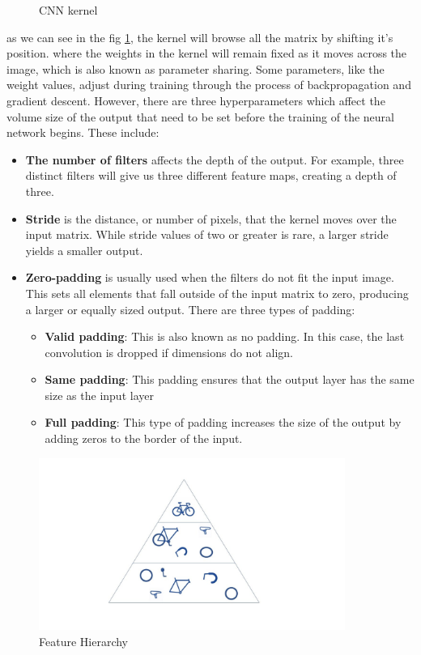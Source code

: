 \begin{enumerate}
\begin{figure}[H]
            \caption{CNN kernel}
            \label{fig:CNN-kernel}
        \end{figure}
        as we can see in the fig \ref{fig:CNN-kernel}, the kernel will browse all the matrix by shifting it's position. where the weights in the kernel will remain fixed as it moves across the image, which is also known as parameter sharing. Some parameters, like the weight values, adjust during training through the process of backpropagation and gradient descent. However, there are three hyperparameters which affect the volume size of the output that need to be set before the training of the neural network begins. These include:
        \begin{itemize}
            \item \textbf{The number of filters} affects the depth of the output. For example, three distinct filters will give us three different feature maps, creating a depth of three.
            \item \textbf{Stride} is the distance, or number of pixels, that the kernel moves over the input matrix. While stride values of two or greater is rare, a larger stride yields a smaller output.
            \item \textbf{Zero-padding }is usually used when the filters do not fit the input image. This sets all elements that fall outside of the input matrix to zero, producing a larger or equally sized output. There are three types of padding:
            \begin{itemize}
                \item \textbf{Valid padding}: This is also known as no padding. In this case, the last convolution is dropped if dimensions do not align.
                \item \textbf{Same padding}: This padding ensures that the output layer has the same size as the input layer
                \item \textbf{Full padding}: This type of padding increases the size of the output by adding zeros to the border of the input.
            \end{itemize}
        \end{itemize}
        
        \begin{figure}[H]
            \centering
            \includegraphics[width=10cm]{../images/CNN-Feature-Hierarchy.jpg}
            \caption{Feature Hierarchy}
            \label{fig:CNN-Feature-Hierarchy}
        \end{figure}
        

\end{enumerate}
